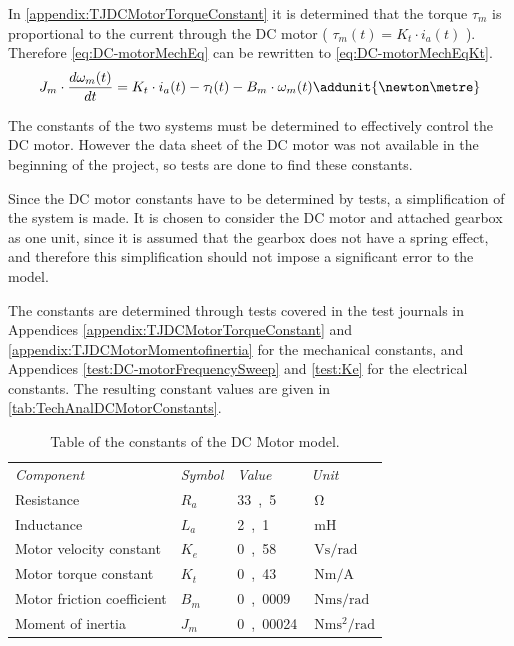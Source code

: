 In \autoref{appendix:TJDCMotorTorqueConstant} it is determined that the torque $\tau_m$ is proportional to the current through the DC motor ( $\tau_m(t)=K_t\cdot i_a(t)$ ). Therefore \autoref{eq:DC-motorMechEq} can be rewritten to \autoref{eq:DC-motorMechEqKt}.
\begin{equation} \label{eq:DC-motorMechEqKt}
J_m \cdot \frac{d \omega_{m}(t)}{d t} = K_t\cdot i_a(t) - \tau_{l}(t) - B_m \cdot \omega_{m}(t) \addunit{\newton\metre}
\end{equation}
\startexplain
{}
\stopexplain

The constants of the two systems must be determined to effectively control the DC motor. However the data sheet of the DC motor was not available in the beginning of the project, so tests are done to find these constants.

Since the DC motor constants have to be determined by tests, a simplification of the system is made. It is chosen to consider the DC motor and attached gearbox as one unit, since it is assumed that the gearbox does not have a spring effect, and therefore this simplification should not impose a significant error to the model.

The constants are determined through tests covered in the test journals in Appendices \ref{appendix:TJDCMotorTorqueConstant} and \ref{appendix:TJDCMotorMomentofinertia} for the mechanical constants, and Appendices \ref{test:DC-motorFrequencySweep} and \ref{test:Ke} for the electrical constants. The resulting constant values are given in \autoref{tab:TechAnalDCMotorConstants}.
\begin{table}[h]
	\centering
	\caption{Table of the constants of the DC Motor model.}\label{tab:TechAnalDCMotorConstants}
	
	\begin{tabular}{l l l l}
		\textit{Component}			&	\textit{Symbol} &  	\textit{Value} &  \textit{Unit} \\ \rowcolor{lightGrey} \toprule
		Resistance					& $R_a$	& \si{33,5}	& $\SI{}{\ohm}$ \\
		Inductance					& $L_a$	& \si{2,1} 	& $\SI{}{\milli\henry}$ \\ \rowcolor{lightGrey}
		Motor velocity constant 	& $K_e$ & \si{0,58}		& $\SI{}{\volt\second\per\radian}$ \\
		Motor torque constant 		& $K_t$ & \si{0,43}		& $\SI{}{\newton\metre\per\ampere}$ \\ \rowcolor{lightGrey}
		Motor friction coefficient 	& $B_m$ & \si{0,0009} 	& $\SI{}{\newton\metre\second\per\radian}$ \\
		Moment of inertia & $J_m$ 	& \si{0,00024} 		& $\SI{}{\newton\metre\second\squared\per\radian}$ \\
	\end{tabular}	
\end{table}

